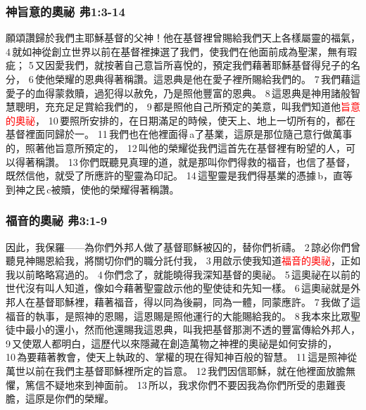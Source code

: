 \subsubsection{神旨意的奧祕 弗1:3-14}
願頌讚歸於我們主耶穌基督的父神！他在基督裡曾賜給我們天上各樣屬靈的福氣， 4 就如神從創立世界以前在基督裡揀選了我們，使我們在他面前成為聖潔，無有瑕疵； 5 又因愛我們，就按著自己意旨所喜悅的，預定我們藉著耶穌基督得兒子的名分， 6 使他榮耀的恩典得著稱讚。這恩典是他在愛子裡所賜給我們的。 7 我們藉這愛子的血得蒙救贖，過犯得以赦免，乃是照他豐富的恩典。 8 這恩典是神用諸般智慧聰明，充充足足賞給我們的， 9 都是照他自己所預定的美意，叫我們知道他\textcolor{red}{旨意的奧祕}， 10 要照所安排的，在日期滿足的時候，使天上、地上一切所有的，都在基督裡面同歸於一。 11 我們也在他裡面得 a了基業，這原是那位隨己意行做萬事的，照著他旨意所預定的， 12 叫他的榮耀從我們這首先在基督裡有盼望的人，可以得著稱讚。 13 你們既聽見真理的道，就是那叫你們得救的福音，也信了基督，既然信他，就受了所應許的聖靈為印記。 14 這聖靈是我們得基業的憑據 b，直等到神之民 c被贖，使他的榮耀得著稱讚。

\subsubsection{福音的奧祕 弗3:1-9}
因此，我保羅——為你們外邦人做了基督耶穌被囚的，替你們祈禱。 2 諒必你們曾聽見神賜恩給我，將關切你們的職分託付我， 3 用啟示使我知道\textcolor{red}{福音的奧祕}，正如我以前略略寫過的。 4 你們念了，就能曉得我深知基督的奧祕。 5 這奧祕在以前的世代沒有叫人知道，像如今藉著聖靈啟示他的聖使徒和先知一樣。 6 這奧祕就是外邦人在基督耶穌裡，藉著福音，得以同為後嗣，同為一體，同蒙應許。 7 我做了這福音的執事，是照神的恩賜，這恩賜是照他運行的大能賜給我的。 8 我本來比眾聖徒中最小的還小，然而他還賜我這恩典，叫我把基督那測不透的豐富傳給外邦人， 9 又使眾人都明白，這歷代以來隱藏在創造萬物之神裡的奧祕是如何安排的， 10 為要藉著教會，使天上執政的、掌權的現在得知神百般的智慧。 11 這是照神從萬世以前在我們主基督耶穌裡所定的旨意。 12 我們因信耶穌，就在他裡面放膽無懼，篤信不疑地來到神面前。 13 所以，我求你們不要因我為你們所受的患難喪膽，這原是你們的榮耀。

